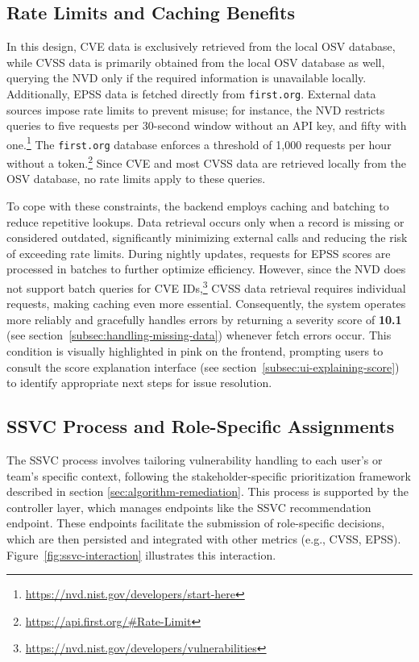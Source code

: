 \subsection{Rate Limits and Caching Benefits}
\label{subsec:rate-limits-caching}

In this design, \ac{CVE} data is exclusively retrieved from the local \ac{OSV} database, while \ac{CVSS} data is primarily obtained from the local \ac{OSV} database as well, querying the \ac{NVD} only if the required information is unavailable locally. Additionally, \ac{EPSS} data is fetched directly from \texttt{first.org}. External data sources impose rate limits to prevent misuse; for instance, the \ac{NVD} restricts queries to five requests per 30-second window without an \ac{API} key, and fifty with one.\footnote{\url{https://nvd.nist.gov/developers/start-here}} The \texttt{first.org} database enforces a threshold of 1,000 requests per hour without a token.\footnote{\url{https://api.first.org/\#Rate-Limit}} Since \ac{CVE} and most \ac{CVSS} data are retrieved locally from the \ac{OSV} database, no rate limits apply to these queries.

To cope with these constraints, the backend employs caching and batching to reduce repetitive lookups. Data retrieval occurs only when a record is missing or considered outdated, significantly minimizing external calls and reducing the risk of exceeding rate limits. During nightly updates, requests for \ac{EPSS} scores are processed in batches to further optimize efficiency. However, since the \ac{NVD} does not support batch queries for \ac{CVE} IDs,\footnote{\url{https://nvd.nist.gov/developers/vulnerabilities}} \ac{CVSS} data retrieval requires individual requests, making caching even more essential. Consequently, the system operates more reliably and gracefully handles errors by returning a severity score of \textbf{10.1} (see section~\ref{subsec:handling-missing-data}) whenever fetch errors occur. This condition is visually highlighted in pink on the frontend, prompting users to consult the score explanation interface (see section~\ref{subsec:ui-explaining-score}) to identify appropriate next steps for issue resolution.

\subsection{SSVC Process and Role-Specific Assignments}
\label{subsec:ssvc-process}

The \ac{SSVC} process involves tailoring vulnerability handling to each user's or team's specific context, following the stakeholder-specific prioritization framework described in section \ref{sec:algorithm-remediation}. This process is supported by the controller layer, which manages endpoints like the \ac{SSVC} recommendation endpoint. These endpoints facilitate the submission of role-specific decisions, which are then persisted and integrated with other metrics (e.g., \ac{CVSS}, \ac{EPSS}). Figure~\ref{fig:ssvc-interaction} illustrates this interaction.

